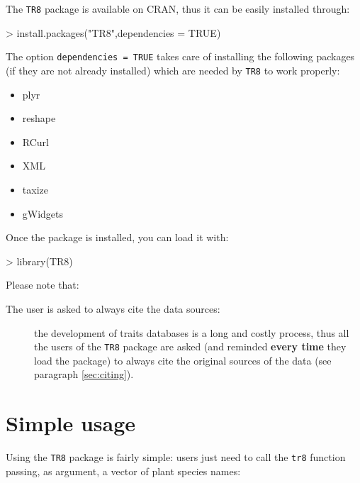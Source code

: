 \documentclass{article}
\begin{document}
  The \texttt{TR8} package is available on CRAN, thus it can be easily installed through:
  
\begin{Schunk}
\begin{Sinput}
> install.packages("TR8",dependencies = TRUE)
\end{Sinput}
\end{Schunk}

The option \texttt{dependencies = TRUE} takes care of installing the
following packages (if they are not already installed) which are
needed by \texttt{TR8} to work properly: 

 \begin{itemize}
  \item plyr\cite{plyr}
  \item reshape\cite{reshape}
  \item RCurl\cite{RCurl}
  \item XML\cite{XML}
  \item taxize\cite{taxize}
  \item gWidgets\cite{gWidgets}
  \end{itemize}
  

  
  Once the package is installed, you can load it with:

\begin{Schunk}
\begin{Sinput}
> library(TR8)
\end{Sinput}
\end{Schunk}

Please note that:

\begin{description}
\item[The user is asked to always cite the data sources: ] the
  development of traits databases is a long and costly process,
  thus all the users of the \texttt{TR8} package are asked (and
  reminded \textbf{every time} they load the package) to always cite the original sources of the data (see
  paragraph \ref{sec:citing}).
  
\end{description}
  
\section{Simple usage}
\label{sec:usage}

  Using the \texttt{TR8} package is fairly simple: users just need to
  call the \texttt{tr8} function passing, as argument, a vector of
  plant species names:
  
\end{document}
